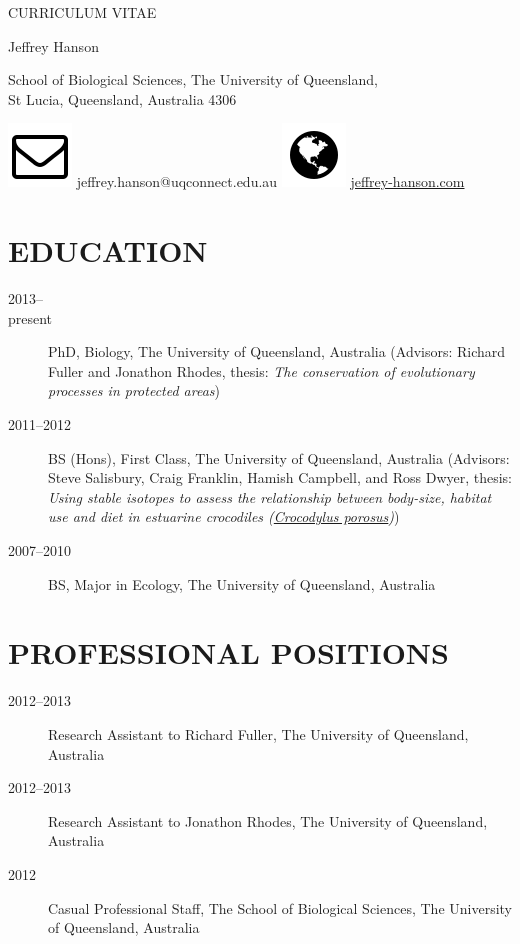 \documentclass[12pt,a4paper]{article}
\begin{document}
\begin{center}

CURRICULUM VITAE

Jeffrey Hanson

School of Biological Sciences, The University of Queensland, \\ St Lucia, Queensland, Australia 4306

\includegraphics[scale=0.2]{envelope-o.png} jeffrey.hanson@uqconnect.edu.au \hspace{0.5em} \includegraphics[scale=0.2]{globe.png} \url{jeffrey-hanson.com}

\end{center}

\section*{EDUCATION}
\begin{description}

\item[2013--\\present] PhD, Biology, The University of Queensland, Australia (Advisors: Richard Fuller and Jonathon Rhodes, thesis: \textit{The conservation of evolutionary processes in protected areas})

\item[2011--2012] BS (Hons), First Class, The University of Queensland, Australia (Advisors: Steve Salisbury, Craig Franklin, Hamish Campbell, and Ross Dwyer, thesis: \textit{Using stable isotopes to assess the relationship between body-size, habitat use and diet in estuarine crocodiles (\underline{Crocodylus porosus})})

\item[2007--2010] BS, Major in Ecology, The University of Queensland, Australia

\end{description}

\section*{PROFESSIONAL POSITIONS}
\begin{description}

\item[2012--2013] Research Assistant to Richard Fuller, The University of Queensland, Australia

\item[2012--2013] Research Assistant to Jonathon Rhodes, The University of Queensland, Australia

\item[2012] Casual Professional Staff, The School of Biological Sciences, The University of Queensland, Australia

\end{description}
\end{document}
